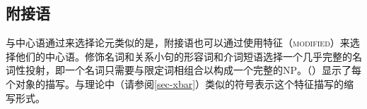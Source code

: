 \subsection{附接语}
\label{Abschnitt-HPSG-Adjunkte}\label{sec-adjuncts-hpsg}

与中心语通过\subcatc 来选择论元类似的是，附接语也可以通过使用特征（\textsc{modified}）来选择他们的中心语。修饰名词和关系小句的形容词和介词短语选择一个几乎完整的名词性投射，即一个名词只需要与限定词相组合以构成一个完整的NP。（）显示了每个对象的描写。与\xbarc 理论中（请参阅\ref{sec-xbar}）类似的符号\nbarc 表示这个特征描写的缩写形式。

